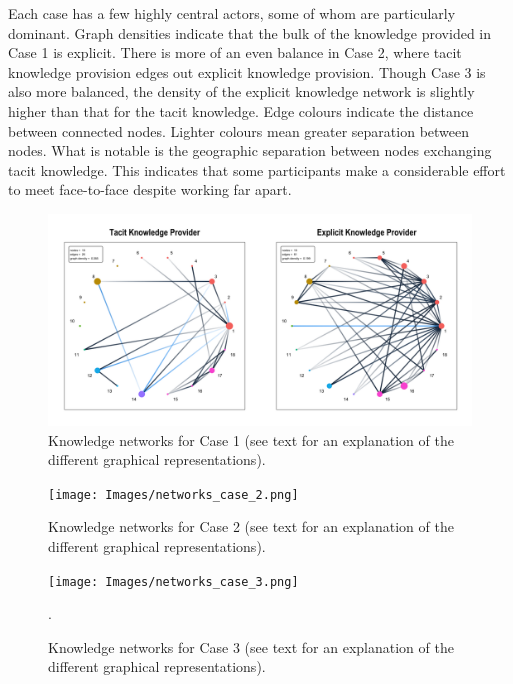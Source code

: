 Each case has a few highly central actors, some of whom are particularly dominant. Graph densities indicate that the bulk of the knowledge provided in Case 1 is explicit. There is more of an even balance in Case 2, where tacit knowledge provision edges out explicit knowledge provision. Though Case 3 is also more balanced, the density of the explicit knowledge network is slightly higher than that for the tacit knowledge. Edge colours indicate the distance between connected nodes. Lighter colours mean greater separation between nodes. What is notable is the geographic separation between nodes exchanging tacit knowledge. This indicates that some participants make a considerable effort to meet face-to-face despite working far apart. \medskip

\begin{figure}
\includegraphics[width=1\linewidth]{Images/networks_case_1.png}
\caption[Knowledge networks for Case 1]{Knowledge networks for Case 1 (see text for an explanation of the different graphical representations).}
\label{fig:network_case_1} 
\end{figure}

\begin{figure}
\texttt{[image: Images/networks\_case\_2.png]}
\caption[Knowledge networks for Case 2]{Knowledge networks for Case 2 (see text for an explanation of the different graphical representations).}
\label{fig:network_case_2} 
\end{figure}

\begin{figure}
\texttt{[image: Images/networks\_case\_3.png]}
\caption[Knowledge networks for Case 3]{Knowledge networks for Case 3 (see text for an explanation of the different graphical representations).}. 
\label{fig:network_case_3} 
\end{figure}

